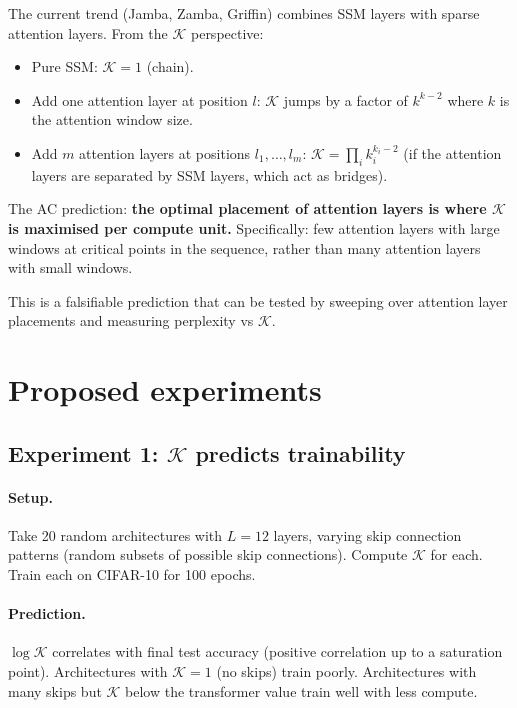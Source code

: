 \documentclass[11pt,a4paper]{article}
\newcommand{\K}{\mathcal{K}}
\begin{document}
The current trend (Jamba, Zamba, Griffin) combines SSM layers with
sparse attention layers.  From the $\K$ perspective:

\begin{itemize}
\item Pure SSM: $\K = 1$ (chain).
\item Add one attention layer at position $l$: $\K$ jumps by a factor
  of $k^{k-2}$ where $k$ is the attention window size.
\item Add $m$ attention layers at positions $l_1, \ldots, l_m$:
  $\K = \prod_i k_i^{k_i-2}$ (if the attention layers are separated
  by SSM layers, which act as bridges).
\end{itemize}

The AC prediction: \textbf{the optimal placement of attention layers
is where $\K$ is maximised per compute unit.}  Specifically:
few attention layers with large windows at critical points in the
sequence, rather than many attention layers with small windows.

This is a falsifiable prediction that can be tested by sweeping
over attention layer placements and measuring perplexity vs $\K$.


\section{Proposed experiments}

\subsection{Experiment 1: $\K$ predicts trainability}

\paragraph{Setup.}
Take 20 random architectures with $L = 12$ layers, varying skip
connection patterns (random subsets of possible skip connections).
Compute $\K$ for each.  Train each on CIFAR-10 for 100 epochs.

\paragraph{Prediction.}
$\log \K$ correlates with final test accuracy (positive correlation
up to a saturation point).  Architectures with $\K = 1$ (no skips)
train poorly.  Architectures with many skips but $\K$ below the
transformer value train well with less compute.
\end{document}
